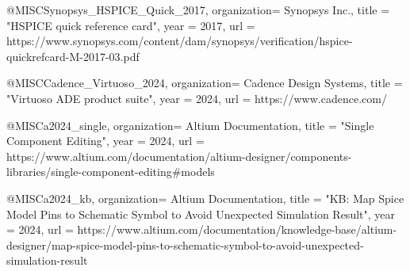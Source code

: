 \documentclass[conference]{IEEEtran}
\begin{document}
\begin{thebibliography}
@MISC{Synopsys_HSPICE_Quick_2017,
    organization=   {Synopsys Inc.},
    title       =   "{HSPICE quick reference card}",
    year        =   {2017},
    url         =   {https://www.synopsys.com/content/dam/synopsys/verification/hspice-quickrefcard-M-2017-03.pdf}
}

@MISC{Cadence_Virtuoso_2024,
    organization=   {Cadence Design Systems},
    title       =   "{Virtuoso {ADE} product suite}",
    year        =   {2024},
    url         =   {https://www.cadence.com/}
}

@MISC{a2024_single,
    organization=   {Altium Documentation},
    title       =   "{Single Component Editing}",
    year        =   {2024},
    url         =   {https://www.altium.com/documentation/altium-designer/components-libraries/single-component-editing#models}
}

@MISC{a2024_kb,
    organization=   {Altium Documentation},
    title       =   "{KB: Map Spice Model Pins to Schematic Symbol to Avoid Unexpected Simulation Result}",
    year        =   {2024},
    url         =   {https://www.altium.com/documentation/knowledge-base/altium-designer/map-spice-model-pins-to-schematic-symbol-to-avoid-unexpected-simulation-result}
}

\end{thebibliography}
\end{document}
